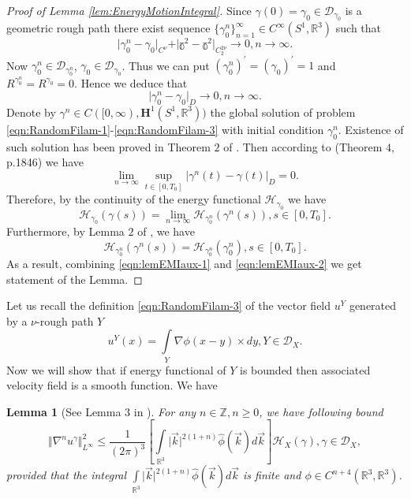 \documentclass[11pt,a4paper,leqno]{amsart}%
\theoremstyle{plain}
\theoremstyle{remark}
\theoremstyle{plain}
\newtheorem{lemma}[theorem]{Lemma}
\numberwithin{equation}{section}
\def\Rnu{{\mathbb R}}
\def\liml{\lim\limits}
\def\supl{\sup\limits}
\def\intl{\int\limits}
\def\supl{\mathop{\sup}\limits}
\begin{document}
\begin{proof}[Proof of Lemma \ref{lem:EnergyMotionIntegral}]
Since $\gamma(0)=\gamma_0\in \mathcal{D}_{\gamma_0}$ is a geometric rough path
there exist sequence $\{\gamma_0^n\}_{n=1}^{\infty}\in C^{\infty}(S^1,\Rnu^3)$ such that
\[
\vert \gamma_0^n-\gamma_0\vert_{C^{\nu}}+\vert \mathbb{\gamma}^2-\mathbb{\gamma}^2\vert_{C_2^{2\nu}}\to 0,n\to\infty.
\]
Now $\gamma_0^n\in \mathcal{D}_{\gamma_0^n}$, $\gamma_0\in \mathcal{D}_{\gamma_0}$. Thus we can put
$(\gamma_0^n)^\prime=(\gamma_0)^\prime=1$ and $R^{\gamma_0^n}=R^{\gamma_0}=0$.
Hence we deduce that
$$
\vert \gamma_0^n-\gamma_0\vert_D\to 0,n\to\infty.
$$
Denote by $\gamma^n\in C([0,\infty),\mathbf{H}^1(S^1,\Rnu^3))$ the
global solution of problem
\eqref{eqn:RandomFilam-1}-\eqref{eqn:RandomFilam-3} with initial
condition $\gamma_0^n$. Existence of such solution has been proved in
Theorem $2$ of \cite{[Bers+Gub_2007]}. Then according to
\cite{[Bers+Gub_2007]} (Theorem $4$, p.1846) we have
$$
\lim_{n\to \infty} \supl_{t\in[0,T_0]}\vert \gamma^n(t)-\gamma(t)\vert_D= 0.
$$
Therefore, by the continuity of the energy functional $\mathcal{H}_{\gamma_0}$ we
have
\begin{equation}
\mathcal{H}_{\gamma_0}(\gamma(s))=\liml_{n\to\infty}\mathcal{H}_{\gamma_0^n}(\gamma^n(s)),s\in[0,T_0].\label{eqn:lemEMIaux-1}
\end{equation}
Furthermore, by Lemma $2$ of \cite{[Bers+Gub_2007]}, we
have
\begin{equation}
\mathcal{H}_{\gamma_0^n}(\gamma^n(s))=\mathcal{H}_{\gamma_0^n}(\gamma_0^n),s\in[0,T_0].\label{eqn:lemEMIaux-2}
\end{equation}
As a result, combining \eqref{eqn:lemEMIaux-1} and
\eqref{eqn:lemEMIaux-2} we get statement of the Lemma.
\end{proof}
Let us recall the definition \eqref{eqn:RandomFilam-3} of the vector field $u^Y$ generated by a $\nu$-rough path $Y$
\begin{equation}
u^Y(x)=\intl_Y\nabla\phi(x-y)\times dy,Y\in
\mathcal{D}_X.\label{eqn:RandomFilam-3'}
\end{equation}
Now we will show that if energy functional of $Y$ is bounded then
associated velocity field  is a smooth function. We have
\begin{lemma}[See Lemma $3$ in \cite{[Bers+Gub_2007]}]\label{lem:VelocitySmoothness}
For any $n\in \mathbb{Z},n\geq 0$, we have following bound
\begin{equation}
\Vert \nabla^n u^{\gamma}\Vert^2_{L^{\infty}}\leq
\frac{1}{(2\pi)^{3}}\left[\intl_{\Rnu^3}\vert \vec{k}\vert^{2(1+n)}\hat{\phi}(\vec{k})d\vec{k}\right]\mathcal{H}_X(\gamma),
\gamma\in\mathcal{D}_X,\label{eqn:VelocitySmoothness}
\end{equation}
provided that the integral
$\intl_{\Rnu^3}\vert \vec{k}\vert^{2(1+n)}\hat{\phi}(\vec{k})d\vec{k}$ is
finite and $\phi\in C^{n+4}(\Rnu^3,\Rnu^3)$.
\end{lemma}
\end{document}

